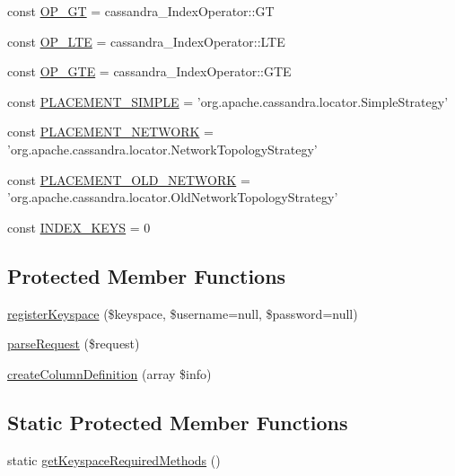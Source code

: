 \begin{DoxyCompactItemize}
const \hyperlink{classCassandra_a660ca00d7f33558017e15ccc1f8f5d29}{OP\_\-GT} = cassandra\_\-IndexOperator::GT
\item 
const \hyperlink{classCassandra_ab633158313b4f7f785910884d950f945}{OP\_\-LTE} = cassandra\_\-IndexOperator::LTE
\item 
const \hyperlink{classCassandra_a60a245248555c96cadec6977014c27df}{OP\_\-GTE} = cassandra\_\-IndexOperator::GTE
\item 
const \hyperlink{classCassandra_acae99f4717a1b6a2fb14343b9ca02806}{PLACEMENT\_\-SIMPLE} = 'org.apache.cassandra.locator.SimpleStrategy'
\item 
const \hyperlink{classCassandra_a82e1fae7c469b0983ad1d38b309273fd}{PLACEMENT\_\-NETWORK} = 'org.apache.cassandra.locator.NetworkTopologyStrategy'
\item 
const \hyperlink{classCassandra_a3ea159c9a7ead7fa56cac7f8ebe9bc74}{PLACEMENT\_\-OLD\_\-NETWORK} = 'org.apache.cassandra.locator.OldNetworkTopologyStrategy'
\item 
const \hyperlink{classCassandra_aa3d7e3c4c9454133e7b21165bb7c3953}{INDEX\_\-KEYS} = 0
\end{DoxyCompactItemize}
\subsection*{Protected Member Functions}
\begin{DoxyCompactItemize}
\item 
\hyperlink{classCassandra_a22c9c1782896b9ee47117643c89f0052}{registerKeyspace} (\$keyspace, \$username=null, \$password=null)
\item 
\hyperlink{classCassandra_a960d23553468532df3d4c6bf712bb2f7}{parseRequest} (\$request)
\item 
\hyperlink{classCassandra_a48c9d0cb51ea0ac56949b7865760ed5e}{createColumnDefinition} (array \$info)
\end{DoxyCompactItemize}
\subsection*{Static Protected Member Functions}
\begin{DoxyCompactItemize}
\item 
static \hyperlink{classCassandra_ad051f9ef0cdc597c5838124c58e9f962}{getKeyspaceRequiredMethods} ()
\end{DoxyCompactItemize}

